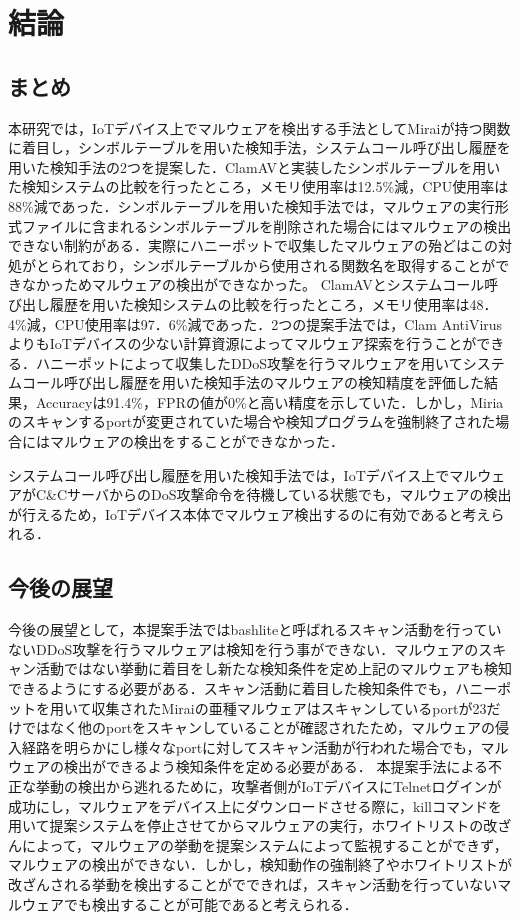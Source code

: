 \chapter{結論}

\section{まとめ}
本研究では，IoTデバイス上でマルウェアを検出する手法としてMiraiが持つ関数に着目し，シンボルテーブルを用いた検知手法，システムコール呼び出し履歴を用いた検知手法の2つを提案した．ClamAVと実装したシンボルテーブルを用いた検知システムの比較を行ったところ，メモリ使用率は12.5\%減，CPU使用率は88\%減であった．シンボルテーブルを用いた検知手法では，マルウェアの実行形式ファイルに含まれるシンボルテーブルを削除された場合にはマルウェアの検出できない制約がある．実際にハニーポットで収集したマルウェアの殆どはこの対処がとられており，シンボルテーブルから使用される関数名を取得することができなかっためマルウェアの検出ができなかった。
ClamAVとシステムコール呼び出し履歴を用いた検知システムの比較を行ったところ，メモリ使用率は48．4\%減，CPU使用率は97．6\%減であった．2つの提案手法では，Clam AntiVirusよりもIoTデバイスの少ない計算資源によってマルウェア探索を行うことができる．ハニーポットによって収集したDDoS攻撃を行うマルウェアを用いてシステムコール呼び出し履歴を用いた検知手法のマルウェアの検知精度を評価した結果，Accuracyは91.4\%，FPRの値が0\%と高い精度を示していた．しかし，Miriaのスキャンするportが変更されていた場合や検知プログラムを強制終了された場合にはマルウェアの検出をすることができなかった．\par
システムコール呼び出し履歴を用いた検知手法では，IoTデバイス上でマルウェアがC\&CサーバからのDoS攻撃命令を待機している状態でも，マルウェアの検出が行えるため，IoTデバイス本体でマルウェア検出するのに有効であると考えられる．

\section{今後の展望}
今後の展望として，本提案手法ではbashliteと呼ばれるスキャン活動を行っていないDDoS攻撃を行うマルウェアは検知を行う事ができない．マルウェアのスキャン活動ではない挙動に着目をし新たな検知条件を定め上記のマルウェアも検知できるようにする必要がある．スキャン活動に着目した検知条件でも，ハニーポットを用いて収集されたMiraiの亜種マルウェアはスキャンしているportが23だけではなく他のportをスキャンしていることが確認されたため，マルウェアの侵入経路を明らかにし様々なportに対してスキャン活動が行われた場合でも，マルウェアの検出ができるよう検知条件を定める必要がある．
本提案手法による不正な挙動の検出から逃れるために，攻撃者側がIoTデバイスにTelnetログインが成功にし，マルウェアをデバイス上にダウンロードさせる際に，killコマンドを用いて提案システムを停止させてからマルウェアの実行，ホワイトリストの改ざんによって，マルウェアの挙動を提案システムによって監視することができず，マルウェアの検出ができない．しかし，検知動作の強制終了やホワイトリストが改ざんされる挙動を検出することがでできれば，スキャン活動を行っていないマルウェアでも検出することが可能であると考えられる．
